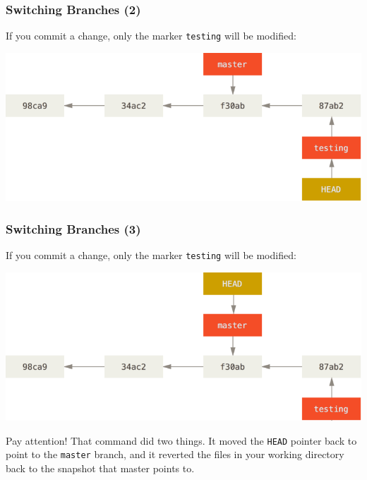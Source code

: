 
\begin{frame}

  \frametitle{Switching Branches (2)}

  If you commit a change, only the marker \texttt{testing} will be modified:

  \gitcommitbranch

  \begin{center}
    \includegraphics[width=0.8\linewidth]{figures/advance-testing}
  \end{center}

\end{frame}

\begin{frame}
  \frametitle{Switching Branches (3)}

  If you commit a change, only the marker \texttt{testing} will be modified:

  \gitcheckoutmaster
  \vspace{-1em}
  \begin{center}
    \includegraphics[width=0.7\linewidth]{figures/checkout-master}
  \end{center}
  \begin{alertblock}{Pay attention!}
  That command did two things. It moved the \texttt{HEAD} pointer back to point to the \texttt{master} branch, and it reverted the files in your working directory back to the snapshot that master points to. 
  \end{alertblock}
\end{frame}

